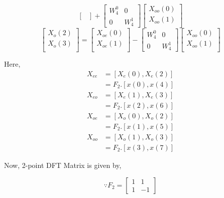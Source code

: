 \documentclass[journal,12pt,twocolumn]{IEEEtran}
\renewcommand\thesection{\arabic{section}}
\begin{document}
\begin{enumerate}[label=\thesection.\arabic*.,ref=\thesection.\theenumi]
\begin{equation}
\begin{bmatrix}
\end{bmatrix}
+
\begin{bmatrix}
W^{0}_{4} & 0\\
0 & W^{1}_{4}
\end{bmatrix}
\begin{bmatrix}
X_{oo}(0) \\ 
X_{oo}(1) \\ 
\end{bmatrix}
\end{equation}
\begin{equation}
\begin{bmatrix}
X_{o}(2) \\ 
X_{o}(3)\\ 
\end{bmatrix}
=
\begin{bmatrix}
X_{oe}(0) \\ 
X_{oe}(1)\\ 
\end{bmatrix}
-
\begin{bmatrix}
W^{0}_{4} & 0\\
0 & W^{1}_{4}
\end{bmatrix}
\begin{bmatrix}
X_{oo}(0) \\ 
X_{oo}(1) \\ 
\end{bmatrix}
\end{equation}

Here,
\begin{align}
    X_{ee} &= [X_{e}(0),X_{e}(2)] \\
    &=F_{2}.[x(0),x(4)]\\
    X_{eo} &= [X_{e}(1),X_{e}(3)]\\
    &=F_{2}.[x(2),x(6)]\\
    X_{oe} &= [X_{o}(0),X_{o}(2)] \\
    &=F_{2}.[x(1),x(5)]\\
    X_{oo} &= [X_{o}(1),X_{o}(3)]\\
    &=F_{2}.[x(3),x(7)]
\end{align}

\newpage
Now, 2-point DFT Matrix is given by, 

\begin{equation}
\because
F_{2} =
\begin{bmatrix}
1 & 1 \\
1&-1
\end{bmatrix}
\end{equation}


\end{enumerate}
\end{document}
